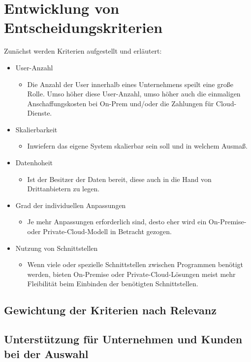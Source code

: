 \documentclass[12pt,bibtotoc]{article}
\begin{document}
			\section{Entwicklung von Entscheidungskriterien}
	Zunächst werden Kriterien aufgestellt und erläutert:
	\begin{itemize}
		\item User-Anzahl
		\begin{itemize}
			\item Die Anzahl der User innerhalb eines Unternehmens speilt eine große Rolle. Umso höher diese User-Anzahl, umso höher auch die einmaligen Anschaffungskosten bei On-Prem und/oder die Zahlungen für Cloud-Dienste.
		\end{itemize}
		\item Skalierbarkeit
			\begin{itemize}
				\item Inwiefern das eigene System skalierbar sein soll und in welchem Ausmaß.
			\end{itemize}
		\item Datenhoheit
			\begin{itemize}
				\item Ist der Besitzer der Daten bereit, diese auch in die Hand von Drittanbietern zu legen.
			\end{itemize}
		\item Grad der individuellen Anpassungen
			\begin{itemize}
				\item Je mehr Anpassungen erforderlich sind, desto eher wird ein On-Premise- oder Private-Cloud-Modell in Betracht gezogen.
			\end{itemize}
		\item Nutzung von Schnittstellen
			\begin{itemize}
				\item Wenn viele oder spezielle Schnittstellen zwischen Programmen benötigt werden, bieten On-Premise oder Private-Cloud-Lösungen meist mehr Fleibilität beim Einbinden der benötigten Schnittstellen.
			\end{itemize}
	\end{itemize}
		\subsection{Gewichtung der Kriterien nach Relevanz}
		\subsection{Unterstützung für Unternehmen und Kunden bei der Auswahl}
\end{document}
